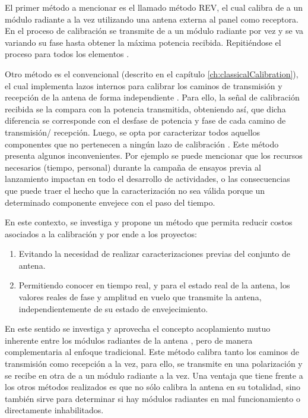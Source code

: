 El primer método a mencionar es el llamado método REV, el cual calibra de a un módulo radiante a la vez utilizando una antena
externa al panel como receptora. En el proceso de calibración se transmite de a un módulo radiante por vez y se va variando su
fase hasta obtener la máxima potencia recibida. Repitiéndose el proceso para todos los elementos \cite{Chiba1999}
\cite{Makino2006}\cite{Hara1997}.

Otro método es el convencional (descrito en el capítulo \ref{ch:classicalCalibration}), el cual implementa lazos internos
para calibrar los caminos de transmisión y recepción de la antena de forma independiente \cite{Makhoul2012}
\cite{Luscombe1990}\cite{Seifert1996}\cite{Dall1994}\cite{Freeman1995}\cite{Bibby2003}\cite{Bast2003}\cite{Stove2004}
\cite{Srivastava1996}\cite{Wang2010}. Para ello, la señal de calibración recibida se la compara con la potencia transmitida,
obteniendo así, que dicha diferencia se corresponde con el desfase de potencia y fase de cada camino de transmisión/
recepción. Luego, se opta por caracterizar todos aquellos componentes que no pertenecen a ningún lazo de calibración
\cite{Freeman1995}. Este método presenta algunos inconvenientes. Por ejemplo se puede mencionar que los recursos necesarios
(tiempo, personal) durante la campaña de ensayos previa al lanzamiento impactan en todo el desarrollo de actividades,
o las consecuencias que puede traer el hecho que la caracterización no sea válida porque un determinado componente
envejece con el paso del tiempo.

En este contexto, se investiga y propone un método que permita reducir costos asociados a la calibración y por ende a los
proyectos:

\begin{enumerate}
    \item Evitando la necesidad de realizar caracterizaciones previas del conjunto de antena.
    \item Permitiendo conocer en tiempo real, y para el estado real de la antena, los valores reales de fase y amplitud en
		vuelo que transmite la antena, independientemente de su estado de envejecimiento.
\end{enumerate}

En este sentido se investiga y aprovecha el concepto acoplamiento mutuo inherente entre los módulos radiantes de la antena
\cite{Aumann1989}, pero de manera complementaria al enfoque tradicional. Este método calibra tanto los caminos de transmisión
como recepción a la vez, para ello, se transmite en una polarización y se recibe en otra de a un módulo radiante a la vez.
Una ventaja que tiene frente a los otros métodos realizados es que no sólo calibra la antena en su totalidad, sino también
sirve para determinar si hay módulos radiantes en mal funcionamiento o directamente inhabilitados.


